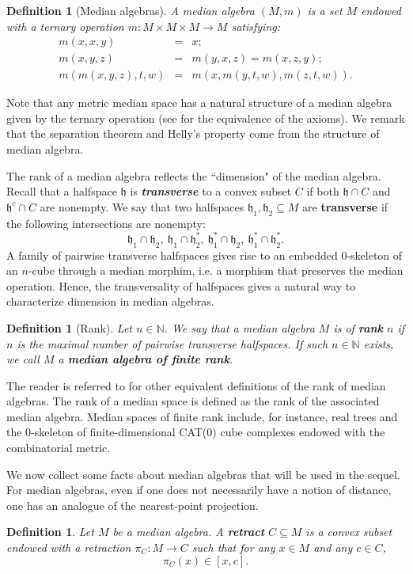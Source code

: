 \documentclass{amsart}
\numberwithin{equation}{section}
\newtheorem{defi}[thm]{Definition}
\newcommand{\hh}{\mathfrak{h}}    %
\theoremstyle{definition}
\begin{document}
\begin{defi}[Median algebras]
    A median algebra $(M,m)$ is a set $M$ endowed with a ternary operation $m: M \times M \times M \to M $ satisfying:
    \begin{eqnarray*}
        m(x,x,y)  &=& x;\\
        m(x,y,z)  &=& m(y,x,z) = m(x,z,y);\\
  m(m(x,y,z),t,w) &=& m(x,m(y,t,w),m(z,t,w)).
    \end{eqnarray*}
\end{defi}
Note that any metric median space has a natural structure of a median algebra given by the ternary operation (see \cite{Sholander} for the equivalence of the axioms). We remark that the separation theorem and Helly's property come from the structure of median algebra. \par 
The rank of a median algebra reflects the ``dimension" of the median algebra. Recall that a halfspace $\hh$ is \textbf{\textit{transverse}} to a convex subset $C$ if both $\hh \cap C$ and $\hh^{c} \cap C$ are nonempty. We say that two halfspaces $\hh_1,\hh_2\subseteq M$ are \textbf{transverse} if the following intersections are nonempty:
\[
\hh_1\cap\hh_2,\ \hh_1\cap\hh_2^*,\ \hh_1^*\cap\hh_2,\ \hh_1^*\cap\hh_2^*.
\]
A family of pairwise transverse halfspaces gives rise to an embedded $0$-skeleton of an $n$-cube through a median morphim, i.e. a morphism that preserves the median operation. Hence, the transversality of halfspaces gives a natural way to characterize dimension in median algebras.
\begin{defi}[Rank]
Let $n \in \mathbb{N}$. We say that a median algebra $M$ is of \textbf{\textit{rank}} $n$ if $n$ is the maximal number of pairwise transverse halfspaces. If such $n \in \mathbb{N}$ exists, we call $M$ a \textbf{\textit{median algebra of finite rank}}.   
\end{defi}
The reader is referred to \cite{Bowd_conv} for other equivalent definitions of the rank of median algebras. The rank of a median space is defined as the rank of the associated median algebra. Median spaces of finite rank include, for instance, real trees and the 0-skeleton of finite-dimensional CAT(0) cube complexes endowed with the combinatorial metric. 
\par We now collect some facts about median algebras that will be used in the sequel. For median algebras, even if one does not necessarily have a notion of distance, one has an analogue of the nearest-point projection.
\begin{defi}
    Let $M$ be a median algebra. A \textbf{\textit{retract}} $C\subseteq M$ is a convex subset endowed with a retraction $\pi_C: M\rightarrow C$ such that for any $x\in M$ and any $c\in C$,
    \[
    \pi_C(x)\in[x,c].
    \]
\end{defi}
\end{document}
